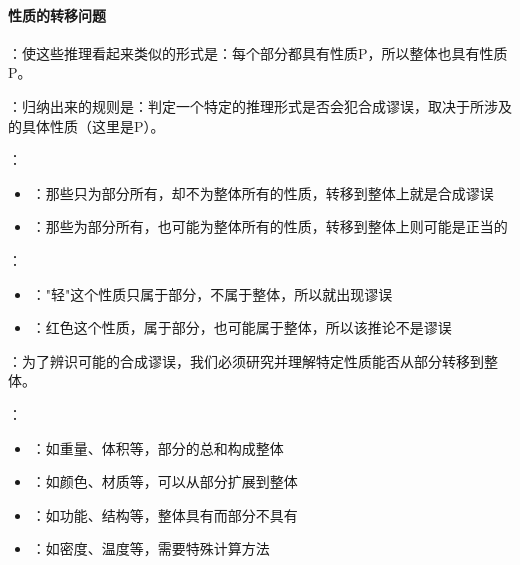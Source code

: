 \paragraph{性质的转移问题}
\begin{examplebox}[title=性质的转移问题]
：使这些推理看起来类似的形式是：每个部分都具有性质P，所以整体也具有性质P。

：归纳出来的规则是：判定一个特定的推理形式是否会犯合成谬误，取决于所涉及的具体性质（这里是P）。

：
\begin{itemize}
  \item {}：那些只为部分所有，却不为整体所有的性质，转移到整体上就是合成谬误
  \item {}：那些为部分所有，也可能为整体所有的性质，转移到整体上则可能是正当的
\end{itemize}

：
\begin{itemize}
  \item {}："轻"这个性质只属于部分，不属于整体，所以就出现谬误
  \item {}：红色这个性质，属于部分，也可能属于整体，所以该推论不是谬误
\end{itemize}

：为了辨识可能的合成谬误，我们必须研究并理解特定性质能否从部分转移到整体。

：
\begin{itemize}
  \item {}：如重量、体积等，部分的总和构成整体
  \item {}：如颜色、材质等，可以从部分扩展到整体
  \item {}：如功能、结构等，整体具有而部分不具有
  \item {}：如密度、温度等，需要特殊计算方法
\end{itemize}
\end{examplebox}

